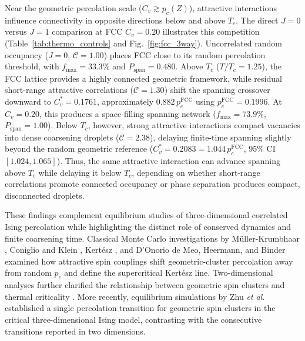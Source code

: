 \documentclass[aps,pre,reprint,superscriptaddress,amsmath,amssymb,floatfix]{revtex4-2}
\begin{document}
Near the geometric percolation scale ($C_v\gtrsim p_c(Z)$), attractive interactions influence connectivity in opposite directions below and above $T_c$. The direct $J=0$ versus $J=1$ comparison at FCC $C_v=0.20$ illustrates this competition (Table~\ref{tab:thermo_controls} and Fig.~\ref{fig:fcc_3way}). Uncorrelated random occupancy ($J=0$, $\mathcal{C}=1.00$) places FCC close to its random percolation threshold, with $f_{\max}=33.3\%$ and $P_{\mathrm{span}}=0.480$. Above $T_c$ ($T/T_c=1.25$), the FCC lattice provides a highly connected geometric framework, while residual short-range attractive correlations ($\mathcal{C}=1.30$) shift the spanning crossover downward to $C_v^*=0.1761$, approximately $0.882\,p_c^{\mathrm{FCC}}$ using $p_c^{\mathrm{FCC}}=0.1996$. At $C_v=0.20$, this produces a space-filling spanning network ($f_{\max}=73.9\%$, $P_{\mathrm{span}}=1.00$). Below $T_c$, however, strong attractive interactions compact vacancies into dense coarsening droplets ($\mathcal{C}=2.38$), delaying finite-time spanning slightly beyond the random geometric reference ($C_v^*=0.2083=1.044\,p_c^{\mathrm{FCC}}$, $95\%$ CI $[1.024,1.065]$). Thus, the same attractive interaction can advance spanning above $T_c$ while delaying it below $T_c$, depending on whether short-range correlations promote connected occupancy or phase separation produces compact, disconnected droplets.

These findings complement equilibrium studies of three-dimensional correlated Ising percolation while highlighting the distinct role of conserved dynamics and finite coarsening time. Classical Monte Carlo investigations by Müller-Krumbhaar \cite{MullerKrumbhaar1974}, Coniglio and Klein \cite{Coniglio1980}, Kertész \cite{Kertesz1989}, and D'Onorio de Meo, Heermann, and Binder \cite{DOnorioDeMeo1990} examined how attractive spin couplings shift geometric-cluster percolation away from random $p_c$ and define the supercritical Kertész line. Two-dimensional analyses further clarified the relationship between geometric spin clusters and thermal criticality \cite{Fortunato2002}. More recently, equilibrium simulations by Zhu \textit{et al.} \cite{Zhu2026} established a single percolation transition for geometric spin clusters in the critical three-dimensional Ising model, contrasting with the consecutive transitions reported in two dimensions.
\end{document}
